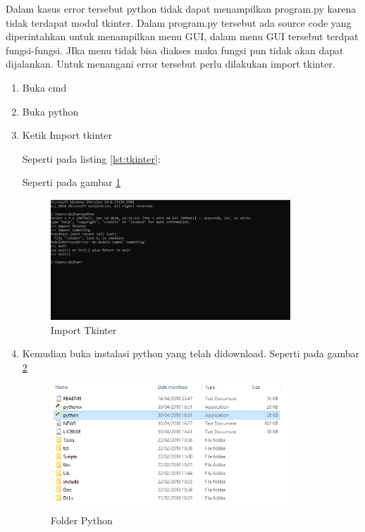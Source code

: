 Dalam kasus error tersebut python tidak dapat menampilkan program.py karena tidak terdapat modul tkinter. Dalam program.py tersebut ada source code yang diperintahkan untuk menampilkan menu GUI, dalam menu GUI tersebut terdpat fungsi-fungsi. JIka menu tidak bisa diakses maka fungsi pun tidak akan dapat dijalankan. Untuk menangani error tersebut perlu dilakukan import tkinter.
\begin{enumerate}
\item Buka cmd
\item Buka python
\item Ketik Import tkinter

Seperti pada listing \ref{lst:tkinter}:


Seperti pada gambar \ref{fig:tkinter}
\begin{figure}[!htbp]
	\centerline{\includegraphics[width=0.85\textwidth]{figures/3/tkinter.PNG}}
	\caption{Import Tkinter}
	\label{fig:tkinter}
\end{figure}

\item Kemudian buka instalasi python yang telah didownload.
Seperti pada gambar \ref{fig:folderpython}
\begin{figure}[!htbp]
	\centerline{\includegraphics[width=0.85\textwidth]{figures/3/folderpython.PNG}}
	\caption{Folder Python}
	\label{fig:folderpython}
\end{figure}


\end{enumerate}
